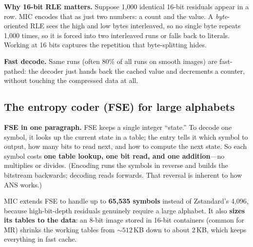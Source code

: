 \documentclass[journal]{IEEEtran}
\begin{document}
\textbf{Why 16-bit RLE matters.} Suppose 1,000 identical 16-bit residuals
appear in a row. MIC encodes that as just two numbers: a count and the value.
A \emph{byte}-oriented RLE sees the high and low bytes interleaved, so no
single byte repeats 1,000 times, so it is forced into two interleaved runs or
falls back to literals. Working at 16 bits captures the repetition that
byte-splitting hides.

\textbf{Fast decode.} Same runs (often 80\% of all runs on smooth images) are
fast-pathed: the decoder just hands back the cached value and decrements a
counter, without touching the compressed data at all.

\subsection{The entropy coder (FSE) for large alphabets}

\textbf{FSE in one paragraph.} FSE keeps a single integer ``state.'' To decode
one symbol, it looks up the current state in a table; the entry tells it which
symbol to output, how many bits to read next, and how to compute the next
state. So each symbol costs \textbf{one table lookup, one bit read, and one
addition}---no multiplies or divides. (Encoding runs the symbols in reverse
and builds the bitstream backwards; decoding reads forwards. That reversal is
inherent to how ANS works.)

MIC extends FSE to handle up to \textbf{65,535 symbols} instead of Zstandard's
4,096, because high-bit-depth residuals genuinely require a large alphabet. It
also \textbf{sizes its tables to the data}: an 8-bit image stored in 16-bit
containers (common for MR) shrinks the working tables from ${\sim}512$\,KB down
to about 2\,KB, which keeps everything in fast cache.
\end{document}

